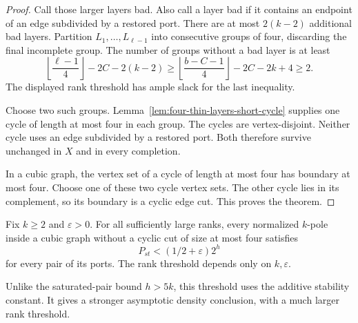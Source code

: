 \begin{proof}
Call those larger layers bad.
Also call a layer bad if it contains an endpoint of an edge subdivided by a restored port.
There are at most $2(k-2)$ additional bad layers.
Partition $L_1,\ldots,L_{\ell-1}$ into consecutive groups of four, discarding the final incomplete group.
The number of groups without a bad layer is at least
\[
 \left\lfloor\frac{\ell-1}{4}\right\rfloor-2C-2(k-2)
 \ge\left\lfloor\frac{b-C-1}{4}\right\rfloor-2C-2k+4
 \ge2.
\]
The displayed rank threshold has ample slack for the last inequality.

Choose two such groups.
Lemma~\ref{lem:four-thin-layers-short-cycle} supplies one cycle of length at most four in each group.
The cycles are vertex-disjoint.
Neither cycle uses an edge subdivided by a restored port.
Both therefore survive unchanged in $X$ and in every completion.

In a cubic graph, the vertex set of a cycle of length at most four has boundary at most four.
Choose one of these two cycle vertex sets.
The other cycle lies in its complement, so its boundary is a cyclic edge cut.
This proves the theorem.
\end{proof}

\begin{corollary}
\label{cor:cyclic-five-path-density}
Fix $k\ge2$ and $\varepsilon>0$.
For all sufficiently large ranks, every normalized $k$-pole inside a cubic graph without a cyclic cut of size at most four satisfies
\[
 P_{st}<(1/2+\varepsilon)2^h
\]
for every pair of its ports.
The rank threshold depends only on $k,\varepsilon$.
\end{corollary}

Unlike the saturated-pair bound $h>5k$, this threshold uses the additive stability constant.
It gives a stronger asymptotic density conclusion, with a much larger rank threshold.

